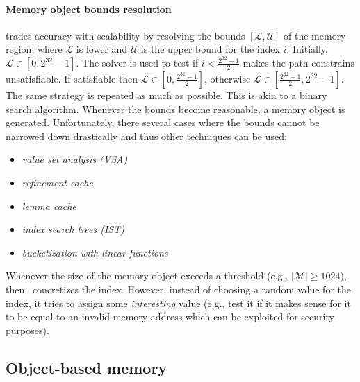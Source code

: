 \paragraph{Memory object bounds resolution} \cite{MAYHEM-SP12} trades accuracy with scalability by resolving the bounds $[\mathcal{L}, \mathcal{U}]$ of the memory region, where $\mathcal{L}$ is lower and $\mathcal{U}$ is the upper bound for the index $i$. Initially, $\mathcal{L} \in [0, 2^{32}-1]$. The solver is used to test if $i < \frac{2^{32}-1}{2}$ makes the path constrains unsatisfiable. If satisfiable then $\mathcal{L} \in [0, \frac{2^{32}-1}{2}]$, otherwise $\mathcal{L} \in [\frac{2^{32}-1}{2}, 2^{32}-1]$. The same strategy is repeated as much as possible. This is akin to a binary search algorithm. Whenever the bounds become reasonable, a memory object is generated. Unfortunately, there several cases where the bounds cannot be narrowed down drastically and thus other techniques can be used:
\begin{itemize}
  \item {\em value set analysis (VSA)}
  \item {\em refinement cache}
  \item {\em lemma cache}
  \item {\em index search trees (IST)}
  \item {\em bucketization with linear functions}
\end{itemize}
Whenever the size of the memory object exceeds a threshold (e.g., $|\mathcal{M}| \geq 1024$), then~\cite{MAYHEM-SP12} concretizes the index. However, instead of choosing a random value for the index, it tries to assign some {\em interesting} value (e.g., test it if it makes sense for it to be equal to an invalid memory address which can be exploited for security purposes).

\subsection{Object-based memory}

